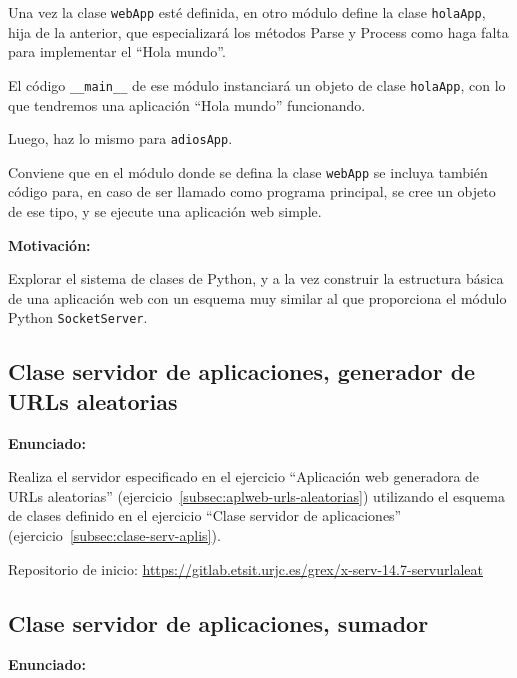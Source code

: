 Una vez la clase \texttt{webApp} esté definida, en otro módulo define la clase \texttt{holaApp}, hija de la anterior, que especializará los métodos Parse y Process como haga falta para implementar el ``Hola mundo''.

El código \verb|__main__| de ese módulo instanciará un objeto de clase \texttt{holaApp}, con lo que tendremos una aplicación ``Hola mundo'' funcionando.

Luego, haz lo mismo para \texttt{adiosApp}.

Conviene que en el módulo donde se defina la clase \texttt{webApp} se incluya también código para, en caso de ser llamado como programa principal, se cree un objeto de ese tipo, y se ejecute una aplicación web simple.

\textbf{Motivación:}

Explorar el sistema de clases de Python, y a la vez construir la estructura básica de una aplicación web con un esquema muy similar al que proporciona el módulo Python \texttt{SocketServer}.

\subsection{Clase servidor de aplicaciones, generador de URLs aleatorias}
\label{subsec:aplweb-clase-urls-aleatorias}

\textbf{Enunciado:}

Realiza el servidor especificado en el ejercicio ``Aplicación web generadora de URLs aleatorias'' (ejercicio~\ref{subsec:aplweb-urls-aleatorias}) utilizando el esquema de clases definido en el ejercicio ``Clase servidor de aplicaciones'' (ejercicio~\ref{subsec:clase-serv-aplis}).

Repositorio de inicio: \url{https://gitlab.etsit.urjc.es/grex/x-serv-14.7-servurlaleat}

\subsection{Clase servidor de aplicaciones, sumador}
\label{subsec:clase-sumador-simple}

\textbf{Enunciado:}

